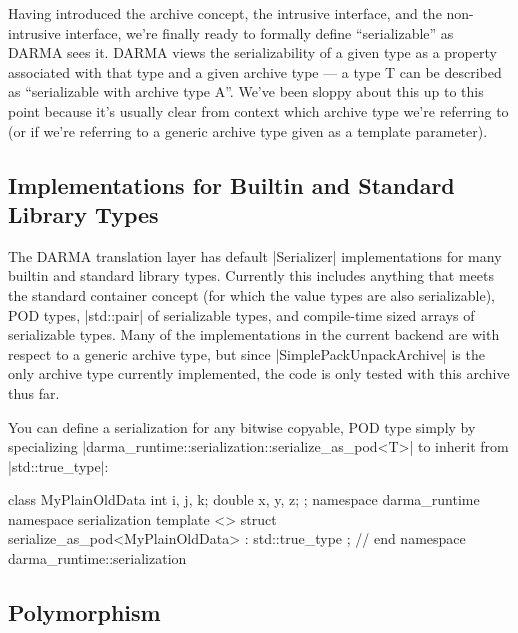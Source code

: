 Having introduced the archive concept, the intrusive interface, and the
non-intrusive interface, we're finally ready to formally define ``serializable''
as DARMA sees it.  DARMA views the serializability of a given type as a property
associated with that type and a given archive type --- a type T can be described
as ``serializable with archive type A''.  We've been sloppy about this up to
this point because it's usually clear from context which archive type we're
referring to (or if we're referring to a generic archive type given as a
template parameter).  

\subsection{Implementations for Builtin and Standard Library Types}

The DARMA translation layer has default |Serializer| implementations for many
builtin and standard library types.  Currently this includes anything that meets
the standard container \gls{concept} (for which the value types are also
serializable), POD types, |std::pair| of serializable types, and
compile-time sized arrays of serializable types.  Many of the implementations in
the current backend are with respect to a generic archive type, but since
|SimplePackUnpackArchive| is the only archive type currently implemented,
the code is only tested with this archive thus far.


You can define a serialization for any bitwise copyable, POD type simply by
specializing |darma_runtime::serialization::serialize_as_pod<T>| to inherit from
|std::true_type|:
\begin{CppCodeNumb}
class MyPlainOldData {
  int i, j, k;
  double x, y, z; 
};
namespace darma_runtime { namespace serialization {
template <>
struct serialize_as_pod<MyPlainOldData> : std::true_type { };
}} // end namespace darma_runtime::serialization
\end{CppCodeNumb}

\subsection{Polymorphism}

